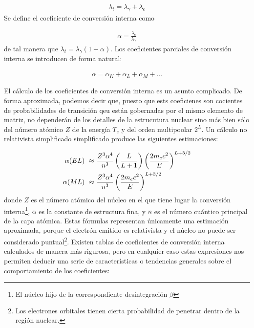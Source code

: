 \begin{eqnarray}
	\lambda_t = \lambda_\gamma + \lambda_e
\end{eqnarray}
Se define el coeficiente de conversión interna como

\begin{eqnarray}
	\alpha = \frac{\lambda_e}{\lambda_\gamma}
\end{eqnarray}
de tal manera que $\lambda_t = \lambda_\gamma (1+\alpha)$. Los coeficientes parciales de conversión interna se introducen de forma natural:

\begin{eqnarray}
	\alpha= \alpha_K + \alpha_L + \alpha_M + \ldots
\end{eqnarray}

El cálculo de los coeficientes de conversión interna es un asunto complicado. De forma aproximada, podemos decir que, puesto que ests coeficienes son cocientes de probabilidades de transición qeu están gobernadas por el mismo elemento de matriz, no dependerán de los detalles de la estrucutura nuclear sino más bien sólo del número atómico $Z$ de la energía $T_e$ y del orden multipoolar $ 2^L$. Un cálculo no relativista simplificado simplificado produce las siguientes estimaciones:

\begin{equation}
	\begin{split}
		\alpha (EL) \ \approx \ & \frac{Z^3\alpha^4}{n^3} \left( \frac{L}{L+1} \right) \left( \frac{2m_ec^2}{E} \right)^{L+5/2} \\
		\alpha (ML) \ \approx \ & \frac{Z^3\alpha^4}{n^3}  \left( \frac{2m_ec^2}{E} \right)^{L+3/2} \\
	\end{split}	
\end{equation}
donde $Z$ es el número atómico del núcleo en el que tiene lugar la conversión interna\footnote{El núcleo hijo de la correspondiente desintegración $\beta$}, $\alpha$ es la constante de estructura fina, y $n$ es el número cuántico principal de la capa atómica. Estas fórmulas representan únicamente una estimación aproximada, porque el electrón emitido es relativista y el núcleo no puede ser considerado puntual\footnote{Los electrones orbitales tienen cierta probabilidad de penetrar dentro de la región nuclear.}. Existen tablas de coeficientes de conversión interna calculados de manera más rigurosa, pero en cualquier caso estas expresiones nos permiten deducir una serie de características o tendencias generales sobre el comportamiento de los coeficientes: 

